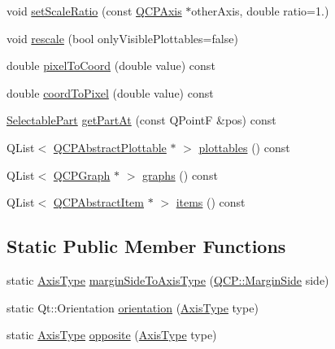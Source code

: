 \begin{DoxyCompactItemize}
\item 
void \hyperlink{class_q_c_p_axis_af4bbd446dcaee5a83ac30ce9bcd6e125}{set\+Scale\+Ratio} (const \hyperlink{class_q_c_p_axis}{Q\+C\+P\+Axis} $\ast$other\+Axis, double ratio=1.)
\item 
void \hyperlink{class_q_c_p_axis_a499345f02ebce4b23d8ccec96e58daa9}{rescale} (bool only\+Visible\+Plottables=false)
\item 
double \hyperlink{class_q_c_p_axis_ae9289ef7043b9d966af88eaa95b037d1}{pixel\+To\+Coord} (double value) const 
\item 
double \hyperlink{class_q_c_p_axis_a985ae693b842fb0422b4390fe36d299a}{coord\+To\+Pixel} (double value) const 
\item 
\hyperlink{class_q_c_p_axis_abee4c7a54c468b1385dfce2c898b115f}{Selectable\+Part} \hyperlink{class_q_c_p_axis_ab2965a8ab1da948b897f1c006080760b}{get\+Part\+At} (const Q\+PointF \&pos) const 
\item 
Q\+List$<$ \hyperlink{class_q_c_p_abstract_plottable}{Q\+C\+P\+Abstract\+Plottable} $\ast$ $>$ \hyperlink{class_q_c_p_axis_a4f7404494cccdbfc00e1e865b7ed16a4}{plottables} () const 
\item 
Q\+List$<$ \hyperlink{class_q_c_p_graph}{Q\+C\+P\+Graph} $\ast$ $>$ \hyperlink{class_q_c_p_axis_ad3919e7d7400f55446ea82018fe5e3a8}{graphs} () const 
\item 
Q\+List$<$ \hyperlink{class_q_c_p_abstract_item}{Q\+C\+P\+Abstract\+Item} $\ast$ $>$ \hyperlink{class_q_c_p_axis_ae437656a5fd1a03721a8f2d7aab460fe}{items} () const 
\end{DoxyCompactItemize}
\subsection*{Static Public Member Functions}
\begin{DoxyCompactItemize}
\item 
static \hyperlink{class_q_c_p_axis_ae2bcc1728b382f10f064612b368bc18a}{Axis\+Type} \hyperlink{class_q_c_p_axis_ac0a6b77bd52bec6c81cd62d167cfeba6}{margin\+Side\+To\+Axis\+Type} (\hyperlink{namespace_q_c_p_a7e487e3e2ccb62ab7771065bab7cae54}{Q\+C\+P\+::\+Margin\+Side} side)
\item 
static Qt\+::\+Orientation \hyperlink{class_q_c_p_axis_a9a68b3e45f1b1e33d4d807822342516c}{orientation} (\hyperlink{class_q_c_p_axis_ae2bcc1728b382f10f064612b368bc18a}{Axis\+Type} type)
\item 
static \hyperlink{class_q_c_p_axis_ae2bcc1728b382f10f064612b368bc18a}{Axis\+Type} \hyperlink{class_q_c_p_axis_aa85ba73dfee6483e23825461b725e363}{opposite} (\hyperlink{class_q_c_p_axis_ae2bcc1728b382f10f064612b368bc18a}{Axis\+Type} type)
\end{DoxyCompactItemize}
